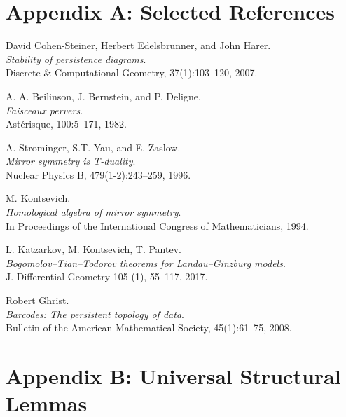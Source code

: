 \documentclass[11pt]{article}
\begin{document}
\section*{Appendix A: Selected References}

\begin{thebibliography}{9}

David Cohen-Steiner, Herbert Edelsbrunner, and John Harer.\\
\textit{Stability of persistence diagrams}.\\
Discrete \& Computational Geometry, 37(1):103--120, 2007.

A. A. Beilinson, J. Bernstein, and P. Deligne.\\
\textit{Faisceaux pervers}.\\
Astérisque, 100:5–171, 1982.

A. Strominger, S.T. Yau, and E. Zaslow.\\
\textit{Mirror symmetry is T-duality}.\\
Nuclear Physics B, 479(1-2):243–259, 1996.

M. Kontsevich.\\
\textit{Homological algebra of mirror symmetry}.\\
In Proceedings of the International Congress of Mathematicians, 1994.

L. Katzarkov, M. Kontsevich, T. Pantev.\\
\textit{Bogomolov–Tian–Todorov theorems for Landau–Ginzburg models}.\\
J. Differential Geometry 105 (1), 55–117, 2017.

Robert Ghrist.\\
\textit{Barcodes: The persistent topology of data}.\\
Bulletin of the American Mathematical Society, 45(1):61--75, 2008.

\end{thebibliography}


\section*{Appendix B: Universal Structural Lemmas}
\end{document}
